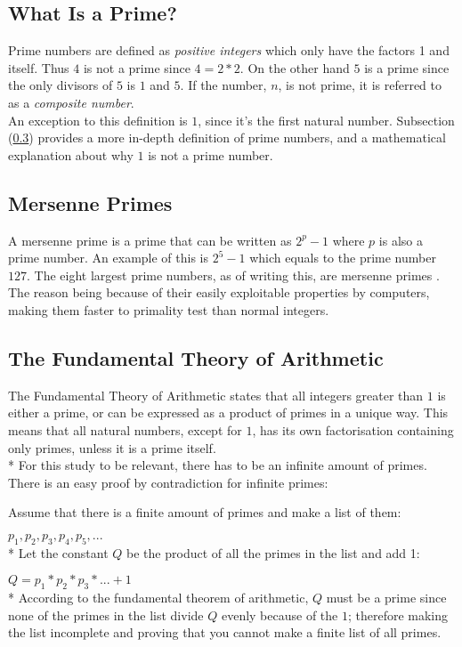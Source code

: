 \documentclass[main.tex]{subfiles}
\begin{document}
\subsection{What Is a Prime?}
Prime numbers are defined as \textit{positive integers} which only have the
factors 1 and itself. Thus $4$ is not a prime since $4 = 2 * 2$. On the other
hand $5$ is a prime since the only divisors of $5$ is $1$ and $5$. If the
number, $n$, is not prime, it is referred to as a \textit{composite number}. \\

An exception to this definition is $1$, since it's the first natural number.
Subsection (\ref{arithmetic}) provides a more in-depth definition of prime
numbers, and a mathematical explanation about why $1$ is not a prime number.

\subsection{Mersenne Primes}
A mersenne prime is a prime that can be written as $2^{p}-1$ where $p$ is also a
prime number. An example of this is $2^5-1$ which equals to the prime number
$127$. The eight largest prime numbers, as of writing this, are mersenne primes
\cite{prime:largest_digits}. The reason being because of their easily
exploitable properties by computers, making them faster to primality test than
normal integers.

\subsection{The Fundamental Theory of Arithmetic} \label{arithmetic} The
Fundamental Theory of Arithmetic \cite{theorem:arithmetic} states that all
integers greater than $1$ is either a prime, or can be expressed as a product of
primes in a unique way. This means that all natural numbers, except for $1$, has
its own factorisation containing only primes, unless it is a prime itself.
\newline
\\*
For this study to be relevant, there has to be an infinite amount of primes.
There is an easy proof by contradiction for infinite primes:

\begin{mdframed}
  Assume that there is a finite amount of primes and make a list of them:

  $p_1, p_2, p_3, p_4, p_5, ...$ \newline
  \\*
  Let the constant $Q$ be the product of all the primes in the list and add 1:

  $Q = p_1 * p_2 * p_3 * ... + 1$ \newline
  \\*
  According to the fundamental theorem of arithmetic, $Q$ must be a prime since
  none of the primes in the list divide $Q$ evenly because of the $1$; therefore
  making the list incomplete and proving that you cannot make a finite list of
  all primes.
\end{mdframed}
\end{document}
